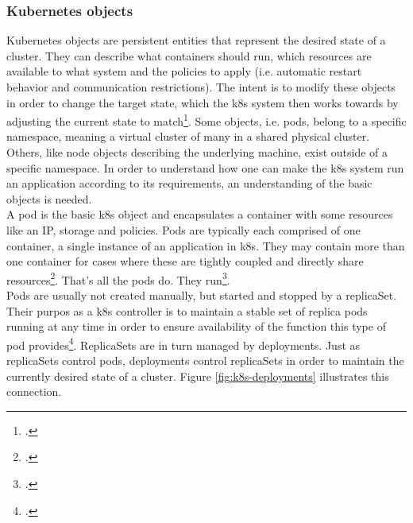 \subsubsection{Kubernetes objects}
Kubernetes objects are persistent entities that represent the desired state of a cluster. They can describe what containers should run, which resources are available to what system and the policies to apply (i.e. automatic restart behavior and communication restrictions).
The intent is to modify these objects in order to change the target state, which the \gls{k8s} system then works towards by adjusting the current state to match\footcite[][, section 'Understanding Kubernetes Objects']{k8sObjects}.
Some objects, i.e. pods, belong to a specific namespace, meaning a virtual cluster of many in a shared physical cluster. Others, like node objects describing the underlying machine, exist outside of a specific namespace.
In order to understand how one can make the \gls{k8s} system run an application according to its requirements, an understanding of the basic objects is needed. \\
A pod is the basic \gls{k8s} object and encapsulates a container with some resources like an IP, storage and policies. Pods are typically each comprised of one container, a single instance of an application in \gls{k8s}. They may contain more than one container for cases where these are tightly coupled and directly share resources\footcite[][, section 'Understanding Pods']{k8sPods}.
That's all the pods do. They run\footcite[][p. 4]{phippy}. \\
Pods are usually not created manually, but started and stopped by a replicaSet. Their purpos as a \gls{k8s} controller is to maintain a stable set of replica pods running at any time in order to ensure availability of the function this type of pod provides\footcite[][, introductory sentence]{k8sReplicaSets}.
ReplicaSets are in turn managed by deployments. Just as replicaSets control pods, deployments control replicaSets in order to maintain the currently desired state of a cluster.
Figure \ref{fig:k8s-deployments} illustrates this connection. \\

